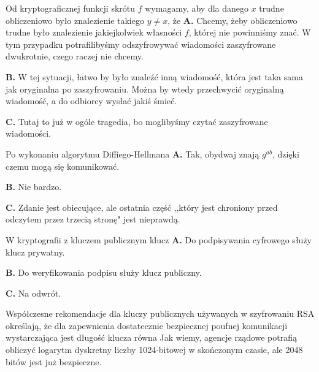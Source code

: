 \begin{solutions}
    \sol Od kryptograficznej funkcji skrótu $f$ wymagamy, aby dla danego $x$ trudne obliczeniowo było znalezienie takiego $y\neq x$, że
    \textbf{A.} Chcemy, żeby obliczeniowo trudne było znalezienie jakiejkolwiek własności $f$, której nie powinniśmy znać. W tym przypadku potrafilibyśmy odszyfrowywać wiadomości zaszyfrowane dwukrotnie, czego raczej nie chcemy.

    \textbf{B.} W tej sytuacji, łatwo by było znaleźć inną wiadomość, która jest taka sama jak oryginalna po zaszyfrowaniu. Można by wtedy przechwycić oryginalną wiadomość, a do odbiorcy wysłać jakiś śmieć.

    \textbf{C.} Tutaj to już w ogóle tragedia, bo moglibyśmy czytać zaszyfrowane wiadomości.

    \sol Po wykonaniu algorytmu Diffiego-Hellmana
    \textbf{A.} Tak, obydwaj znają $g^{ab}$, dzięki czemu mogą się komunikować.

    \textbf{B.} Nie bardzo.

    \textbf{C.} Zdanie jest obiecujące, ale ostatnia część ,,który jest chroniony przed odczytem przez trzecią stronę" jest nieprawdą.

    \sol W kryptografii z kluczem publicznym klucz
    \textbf{A.} Do podpisywania cyfrowego służy klucz prywatny.

    \textbf{B.} Do weryfikowania podpisu służy klucz publiczny.

    \textbf{C.} Na odwrót.

    \sol Współczesne rekomendacje dla kluczy publicznych używanych w szyfrowaniu RSA określają, że dla zapewnienia dostatecznie bezpiecznej poufnej komunikacji wystarczająca jest długość klucza równa
    Jak wiemy, agencje rządowe potrafią obliczyć logarytm dyskretny liczby 1024-bitowej w skończonym czasie, ale 2048 bitów jest już bezpieczne.


\end{solutions}
